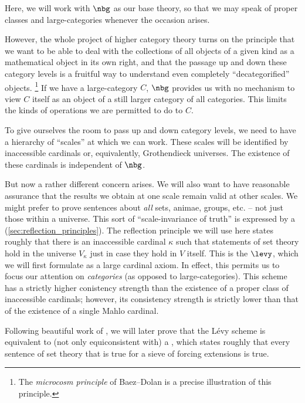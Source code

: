 Here, we will work with $\nbg$ as our base theory,
so that we may speak of proper classes and large-categories
whenever the occasion arises.

However, the whole project of higher category theory turns on the principle that
we want to be able to deal with the collections of all objects of a given kind
as a mathematical object in its own right,
and that the passage up and down these category levels
is a fruitful way to understand even completely \enquote{decategorified} objects.%
\footnote{The \emph{microcosm principle} of Baez--Dolan is a
precise illustration of this principle.} 
If we have a large-category $C$,
$ \nbg $ provides us with no mechanism
to view $C$ itself as an object
of a still larger category of all categories.
This limits the kinds of operations we are permitted to do to $ C $.

To give ourselves the room to pass up and down category levels,
we need to have a hierarchy of \enquote{scales} at which we can work.
These scales will be identified by inaccessible cardinals
or, equivalently, Grothendieck universes.
The existence of these cardinals is independent of $ \nbg $.

But now a rather different concern arises.
We will also want to have reasonable assurance
that the results we obtain at one scale remain valid at other scales.
We might prefer to prove sentences about
\emph{all} sets, animae, groups, etc. --
not just those within a universe.
This sort of \enquote{scale-invariance of truth}
is expressed by a  (\ref{sec:reflection_principles}).
The reflection principle we will use here states roughly that
there is an inaccessible cardinal $ \kappa $ such that
statements of set theory hold in the universe $ V_{\kappa} $
just in case they hold in $V$ itself.
This is the  $ \levy $,
which we will first formulate as a large cardinal axiom.
In effect, this permits us to focus our attention on \emph{categories}
(as opposed to large-categories).
This scheme has a strictly higher conistency strength
than the existence of a proper class of inaccessible cardinals;
however, its consistency strength is strictly lower
than that of the existence of a single Mahlo cardinal.

Following beautiful work of \cite{Hamkins2003},
we will later prove that the Lévy scheme is equivalent to
(not only equiconsistent with)
a ,
which states roughly that every sentence of set theory
that is true for a sieve of forcing extensions is true.

